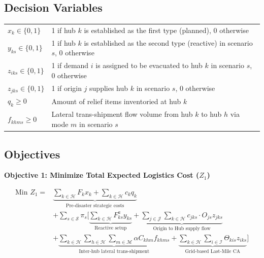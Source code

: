 \documentclass{llncs}
\begin{document}
\subsection{Decision Variables}
\noindent
\begin{tabular}{l p{}}
$x_{k} \in \{0,1\}$ & 1 if hub $k$ is established as the first type (planned), 0 otherwise \\
$y_{ks} \in \{0,1\}$ & 1 if hub $k$ is established as the second type (reactive) in scenario $s$, 0 otherwise \\
$z_{iks} \in \{0,1\}$ & 1 if demand $i$ is assigned to be evacuated to hub $k$ in scenario $s$, 0 otherwise \\
$z_{jks} \in \{0,1\}$ & 1 if origin $j$ supplies hub $k$ in scenario $s$, 0 otherwise \\
$q_{k} \ge 0$ & Amount of relief items inventoried at hub $k$ \\
$f_{khms} \ge 0$ & Lateral trans-shipment flow volume from hub $k$ to hub $h$ via mode $m$ in scenario $s$ \\
\end{tabular}

\subsection{Objectives}
\textbf{Objective 1: Minimize Total Expected Logistics Cost ($Z_1$)}

\begin{equation} \label{eq:obj1}
\begin{aligned}
    \text{Min } Z_1 = & \underbrace{\sum_{k \in \mathcal{H}} F_k x_k + \sum_{k \in \mathcal{H}} c_k q_k}_{\text{Pre-disaster strategic costs}} \\
    & + \sum_{s \in \mathcal{S}} \pi_s \Bigg[ \underbrace{\sum_{k \in \mathcal{H}} F_{ks}^a y_{ks}}_{\text{Reactive setup}} 
    + \underbrace{\sum_{j \in \mathcal{J}} \sum_{k \in \mathcal{H}} c_{jks} \cdot O_{js} z_{jks}}_{\text{Origin to Hub supply flow}} \\
    & + \underbrace{\sum_{k \in \mathcal{H}} \sum_{h \in \mathcal{H}} \sum_{m \in \mathcal{M}} \alpha C_{khm} f_{khms}}_{\text{Inter-hub lateral trans-shipment}} 
    + \underbrace{\sum_{k \in \mathcal{H}} \sum_{i \in \mathcal{I}} \Theta_{kis} z_{iks}}_{\text{Grid-based Last-Mile CA}} 
    \Bigg]
\end{aligned}
\end{equation}
\end{document}
